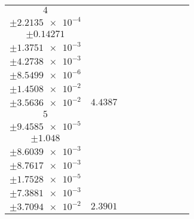 \documentclass[8pt]{article}
\begin{document}
\begin{longtable}[l]{c c c c c c c c c}
$\num{4}$ & \begin{tabular}[c]{@{}c@{}}$\num{7.3921e-2}$ \\ $\pm\num{2.2135e-4}$\end{tabular} & \begin{tabular}[c]{@{}c@{}}$\num{-6.0622}$ \\ $\pm\num{0.14271}$\end{tabular} & \begin{tabular}[c]{@{}c@{}}$\num{0.98054}$ \\ $\pm\num{1.3751e-3}$\end{tabular} & \begin{tabular}[c]{@{}c@{}}$\num{2.9576e+3}$ \\ $\pm\num{4.2738e-3}$\end{tabular} & \begin{tabular}[c]{@{}c@{}}$\num{5.9168}$ \\ $\pm\num{8.5499e-6}$\end{tabular} & \begin{tabular}[c]{@{}c@{}}$\num{4.5083}$ \\ $\pm\num{1.4508e-2}$\end{tabular} & \begin{tabular}[c]{@{}c@{}}$\num{6.4407}$ \\ $\pm\num{3.5636e-2}$\end{tabular} & $\num{4.4387}$\\
$\num{5}$ & \begin{tabular}[c]{@{}c@{}}$\num{3.4456e-2}$ \\ $\pm\num{9.4585e-5}$\end{tabular} & \begin{tabular}[c]{@{}c@{}}$\num{1.4589}$ \\ $\pm\num{1.048}$\end{tabular} & \begin{tabular}[c]{@{}c@{}}$\num{5.6406}$ \\ $\pm\num{8.6039e-3}$\end{tabular} & \begin{tabular}[c]{@{}c@{}}$\num{2.9623e+3}$ \\ $\pm\num{8.7617e-3}$\end{tabular} & \begin{tabular}[c]{@{}c@{}}$\num{5.9262}$ \\ $\pm\num{1.7528e-5}$\end{tabular} & \begin{tabular}[c]{@{}c@{}}$\num{2.6844}$ \\ $\pm\num{7.3881e-3}$\end{tabular} & \begin{tabular}[c]{@{}c@{}}$\num{4.0691}$ \\ $\pm\num{3.7094e-2}$\end{tabular} & $\num{2.3901}$\\

\end{longtable}
\end{document}
